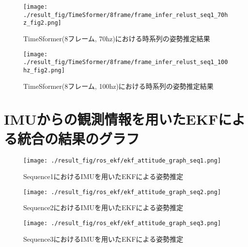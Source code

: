 \begin{figure}[thpb]
  \begin{minipage}[htpb]{1.0\hsize}
  \begin{center}
  \texttt{[image: ./result\_fig/TimeSformer/8frame/frame\_infer\_relust\_seq1\_70hz\_fig2.png]}
  \caption{TimeSformer(8フレーム, 70hz)における時系列の姿勢推定結果}
  \end{center}
  \end{minipage}
\end{figure}

\begin{figure}[thpb]
  \begin{minipage}[htpb]{1.0\hsize}
  \begin{center}
  \texttt{[image: ./result\_fig/TimeSformer/8frame/frame\_infer\_relust\_seq1\_100hz\_fig2.png]}
  \caption{TimeSformer(8フレーム, 100hz)における時系列の姿勢推定結果}
  \end{center}
  \end{minipage}
\end{figure}



\newpage
\section{IMUからの観測情報を用いたEKFによる統合の結果のグラフ}\label{sec:EKF_fig_appendix}

\begin{figure}[thpb]
  \begin{minipage}[htpb]{1.0\hsize}
  \begin{center}
  \texttt{[image: ./result\_fig/ros\_ekf/ekf\_attitude\_graph\_seq1.png]}
  \caption{Sequence1におけるIMUを用いたEKFによる姿勢推定}
  \end{center}
  \end{minipage}
\end{figure}

\begin{figure}[thpb]
  \begin{minipage}[htpb]{1.0\hsize}
  \begin{center}
  \texttt{[image: ./result\_fig/ros\_ekf/ekf\_attitude\_graph\_seq2.png]}
  \caption{Sequence2におけるIMUを用いたEKFによる姿勢推定}
  \end{center}
  \end{minipage}
\end{figure}

\begin{figure}[thpb]
  \begin{minipage}[htpb]{1.0\hsize}
  \begin{center}
  \texttt{[image: ./result\_fig/ros\_ekf/ekf\_attitude\_graph\_seq3.png]}
  \caption{Sequence3におけるIMUを用いたEKFによる姿勢推定}
  \end{center}
  \end{minipage}
\end{figure}

